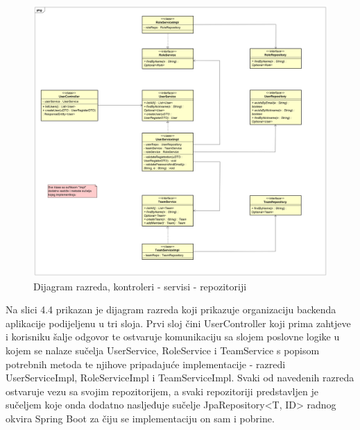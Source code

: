 			\begin{figure}[H]
				\includegraphics[width=\textwidth]{dijagrami/classDiagram2.PNG} 
				\caption{Dijagram razreda, kontroleri - servisi - repozitoriji}
				\label{fig:classDiagram2}
			\end{figure}
		
			Na slici 4.4 prikazan je dijagram razreda koji prikazuje organizaciju backenda aplikacije podijeljenu u tri sloja. Prvi sloj čini UserController koji prima zahtjeve i korisniku šalje odgovor te ostvaruje komunikaciju sa slojem poslovne logike u kojem se nalaze sučelja UserService, RoleService i TeamService s popisom potrebnih metoda te njihove pripadajuće implementacije - razredi UserServiceImpl, RoleServiceImpl i TeamServiceImpl. Svaki od navedenih razreda ostvaruje vezu sa svojim repozitorijem, a svaki repozitoriji predstavljen je sučeljem koje onda dodatno nasljeđuje sučelje JpaRepository\textless T, ID\textgreater{} radnog okvira Spring Boot za čiju se implementaciju on sam i pobrine.
			\newline\newline
	
			
			
	
			
